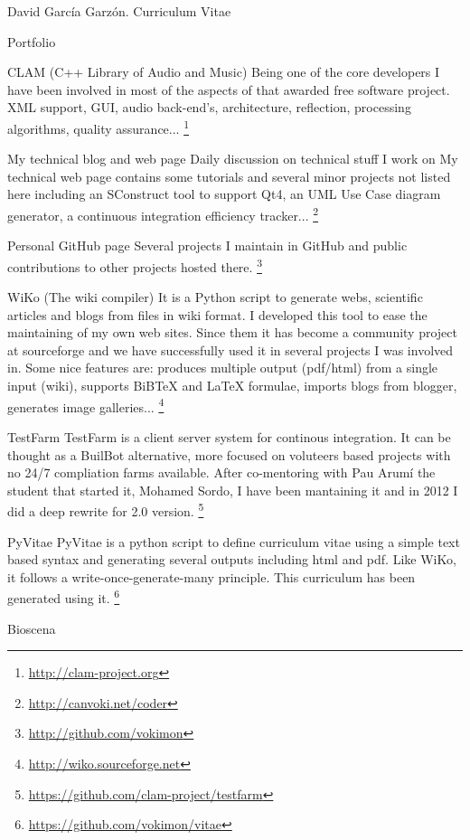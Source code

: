 \documentclass{article}
\begin{document}
\begin{cv}{David García Garzón. Curriculum Vitae}
\begin{cvlist}{Portfolio}
\item[CLAM (C++ Library of Audio and Music)]
Being one of the core developers I have been involved in most of the aspects of that awarded free software project. XML support, GUI, audio back-end's, architecture, reflection, processing algorithms, quality assurance...
\footnote{\href{http://clam-project.org}{http://clam-project.org}}
\item[My technical blog and web page]
Daily discussion on technical stuff I work on My technical web page contains some tutorials and several minor projects not listed here including an SConstruct tool to support Qt4, an UML Use Case diagram generator, a continuous integration efficiency tracker...
\footnote{\href{http://canvoki.net/coder}{http://canvoki.net/coder}}
\item[Personal GitHub page]
Several projects I maintain in GitHub and public contributions to other projects hosted there.
\footnote{\href{http://github.com/vokimon}{http://github.com/vokimon}}
\item[WiKo (The wiki compiler)]
It is a Python script to generate webs, scientific articles and blogs from files in wiki format.  I developed this tool to ease the maintaining of my own web sites. Since them it has become a community project at sourceforge and we have successfully used it in several projects I was involved in. Some nice features are: produces multiple output (pdf/html) from a single input (wiki), supports BiBTeX and LaTeX formulae, imports blogs from blogger, generates image galleries...
\footnote{\href{http://wiko.sourceforge.net}{http://wiko.sourceforge.net}}
\item[TestFarm]
TestFarm is a client server system for continous integration. It can be thought as a BuilBot alternative, more focused on voluteers based projects with no 24/7 compliation farms available. After co-mentoring with Pau Arumí the student that started it, Mohamed Sordo, I have been mantaining it and in 2012 I did a deep rewrite for 2.0 version.
\footnote{\href{https://github.com/clam-project/testfarm}{https://github.com/clam-project/testfarm}}
\item[PyVitae]
PyVitae is a python script to define curriculum vitae using a simple  text based syntax and generating several outputs including html and pdf. Like WiKo, it follows a write-once-generate-many principle. This curriculum has been generated using it.
\footnote{\href{https://github.com/vokimon/vitae}{https://github.com/vokimon/vitae}}
\item[Bioscena]

\end{cvlist}
\end{cv}
\end{document}
